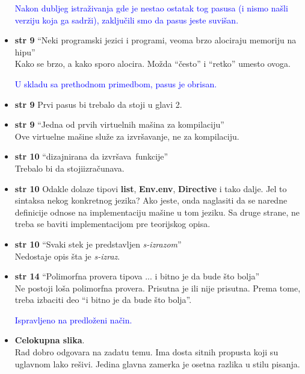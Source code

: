 \documentclass[a4paper]{report}
\newcommand{\odgovor}[1]{\textcolor{blue}{#1}}
\begin{document}
\begin{itemize}
\odgovor{Nakon dubljeg istraživanja gde je nestao ostatak tog pasusa (i nismo našli verziju koja ga sadrži), zaključili smo da pasus jeste suvišan.}

\item \textbf{str 9} ``Neki programski jezici i programi, veoma brzo alociraju memoriju na hipu'' \\ Kako se brzo, a kako sporo alocira. Možda ``često'' i ``retko'' umesto ovoga.

\odgovor{U skladu sa prethodnom primedbom, pasus je obrisan.}

\item \textbf{str 9} Prvi pasus bi trebalo da stoji u glavi 2.

\item \textbf{str 9} ``Jedna od prvih virtuelnih mašina za kompilaciju'' \\ Ove virtuelne mašine služe za izvršavanje, ne za kompilaciju.

\item \textbf{str 10} ``dizajnirana da \color{blue}izvršava\color{black}~funkcije'' \\ Trebalo bi da stoji\color{blue}izračunava\color{black}.

\item \textbf{str 10} Odakle dolaze tipovi \textbf{list}, \textbf{Env.env}, \textbf{Directive} i tako dalje. Jel to sintaksa nekog konkretnog jezika? Ako jeste, onda naglasiti da se naredne definicije odnose na implementaciju mašine u tom jeziku. Sa druge strane, ne treba se baviti implementacijom pre teorijskog opisa.

\item \textbf{str 10} ``Svaki stek je predstavljen \textit{s-izrazom}'' \\ Nedostaje opis šta je \textit{s-izraz}.

\item \textbf{str 14} ``Polimorfna provera tipova ... i bitno je da bude što bolja'' \\ Ne postoji loša polimorfna provera. Prisutna je ili nije prisutna. Prema tome, treba izbaciti deo ``i bitno je da bude što bolja''.

\odgovor{Ispravljeno na predloženi način.}

\item \textbf{Celokupna slika}. \\Rad dobro odgovara na zadatu temu. Ima dosta sitnih propusta koji su uglavnom lako rešivi. Jedina glavna zamerka je osetna razlika u stilu pisanja.
\end{itemize}
\end{document}
